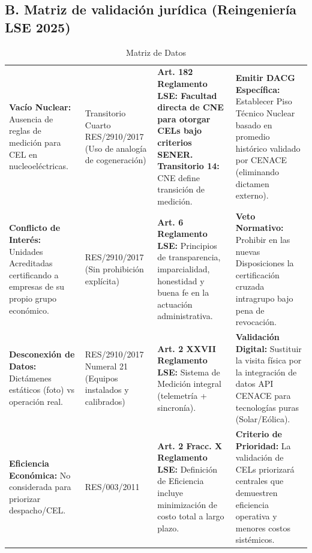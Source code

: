 \documentclass{cel}
\begin{document}
\vspace{0.4cm}
\subsection{B. Matriz de validación jurídica (Reingeniería LSE 2025)}
\nopagebreak

\vspace{0.3cm}
\begin{tabladoradoLargo}
\renewcommand{\tabularxcolumn}[1]{p{#1}}
\begin{xltabular}{\textwidth}{|X|X|X|X|}
\caption{Matriz de Datos} \\
\toprule
{}  &  &  &  \\
\midrule
\endhead
\textbf{Vacío Nuclear:} Ausencia de reglas de medición para CEL en nucleoeléctricas. & Transitorio Cuarto RES/2910/2017 (Uso de analogía de cogeneración) & \textbf{Art. 182 Reglamento LSE: \textbf{ Facultad directa de CNE para otorgar CELs bajo criterios SENER. }Transitorio 14:} CNE define transición de medición. & \textbf{Emitir DACG Específica:} Establecer \textquotedbl{}Piso Técnico Nuclear\textquotedbl{} basado en promedio histórico validado por CENACE (eliminando dictamen externo). \\ \hline
\textbf{Conflicto de Interés:} Unidades Acreditadas certificando a empresas de su propio grupo económico. & RES/2910/2017 (Sin prohibición explícita) & \textbf{Art. 6 Reglamento LSE:} Principios de transparencia, imparcialidad, honestidad y buena fe en la actuación administrativa. & \textbf{Veto Normativo:} Prohibir en las nuevas Disposiciones la certificación cruzada intragrupo bajo pena de revocación. \\ \hline
\textbf{Desconexión de Datos:} Dictámenes estáticos (\textquotedbl{}foto\textquotedbl{}) vs operación real. & RES/2910/2017 Numeral 21 (Equipos instalados y calibrados) & \textbf{Art. 2 XXVII Reglamento LSE:} \textquotedbl{}Sistema de Medición\textquotedbl{} integral (telemetría + sincronía). & \textbf{Validación Digital:} Sustituir la visita física por la integración de datos API CENACE para tecnologías puras (Solar/Eólica). \\ \hline
\textbf{Eficiencia Económica:} No considerada para priorizar despacho/CEL. & RES/003/2011 & \textbf{Art. 2 Fracc. X Reglamento LSE:} Definición de \textquotedbl{}Eficiencia\textquotedbl{} incluye minimización de costo total a largo plazo. & \textbf{Criterio de Prioridad:} La validación de CELs priorizará centrales que demuestren eficiencia operativa y menores costos sistémicos. \\ \hline
\bottomrule
\end{xltabular}
\end{tabladoradoLargo}
\end{document}
